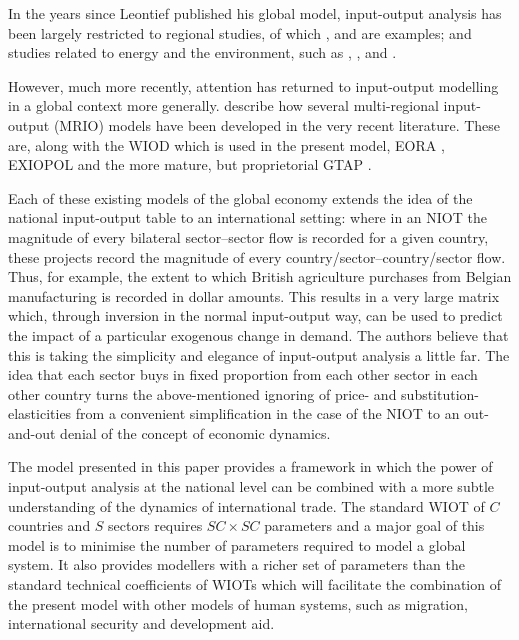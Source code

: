 \documentclass[a4paper]{article}
\begin{document}
In the years since Leontief published his global model, input-output analysis has been largely restricted to regional studies, of which \textcite{akita_interregional_1993}, \textcite{khan_sectoral_1999} and \textcite{luo_power--pull_2013} are examples; and studies related to energy and the environment, such as  \textcite{leontief_environmental_1970}, \textcite{joshi_product_1999}, \textcite{bergh_handbook_2002} and \textcite{hendrickson_environmental_2006}.

However, much more recently, attention has returned to input-output modelling in a global context more generally. \textcite{tukker_global_2013} describe how several multi-regional input-output (MRIO) models have been developed in the very recent literature.
These are, along with the WIOD which is used in the present model, EORA \parencite{lenzen_building_2013}, EXIOPOL \parencite{tukker_exiopol_2013} and the more mature, but proprietorial GTAP \parencite{walmsley_introduction_2012}.

Each of these existing models of the global economy extends the idea of the national input-output table to an international setting: where in an NIOT the magnitude of every bilateral sector--sector flow is recorded for a given country, these projects record the magnitude of every country/sector--country/sector flow.
Thus, for example, the extent to which British agriculture purchases from Belgian manufacturing is recorded in dollar amounts.
This results in a very large matrix which, through inversion in the normal input-output way, can be used to predict the impact of a particular exogenous change in demand.
The authors believe that this is taking the simplicity and elegance of input-output analysis a little far. The idea that each sector buys in fixed proportion from each other sector in each other country turns the above-mentioned ignoring of price- and substitution-elasticities from a convenient simplification in the case of the NIOT to an out-and-out denial of the concept of economic dynamics.

The model presented in this paper provides a framework in which the power of input-output analysis at the national level can be combined with a more subtle understanding of the dynamics of international trade.
The standard WIOT of $C$ countries and $S$ sectors requires $SC\times SC$ parameters and a major goal of this model is to minimise the number of parameters required to model a global system.
It also provides modellers with a richer set of parameters than the standard technical coefficients of WIOTs which will facilitate the combination of the present model with other models of human systems, such as migration, international security and development aid.
\end{document}
